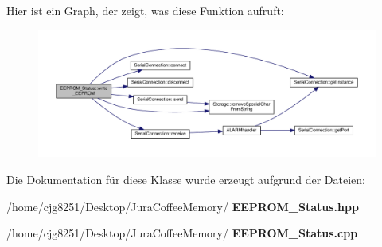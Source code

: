 Hier ist ein Graph, der zeigt, was diese Funktion aufruft\+:
\nopagebreak
\begin{figure}[H]
\begin{center}
\leavevmode
\includegraphics[width=350pt]{class_e_e_p_r_o_m___status_a090e971e61d1a15e76798b444240fd30_cgraph}
\end{center}
\end{figure}


Die Dokumentation für diese Klasse wurde erzeugt aufgrund der Dateien\+:\begin{DoxyCompactItemize}
\item 
/home/cjg8251/\+Desktop/\+Jura\+Coffee\+Memory/\textbf{ E\+E\+P\+R\+O\+M\+\_\+\+Status.\+hpp}\item 
/home/cjg8251/\+Desktop/\+Jura\+Coffee\+Memory/\textbf{ E\+E\+P\+R\+O\+M\+\_\+\+Status.\+cpp}\end{DoxyCompactItemize}
